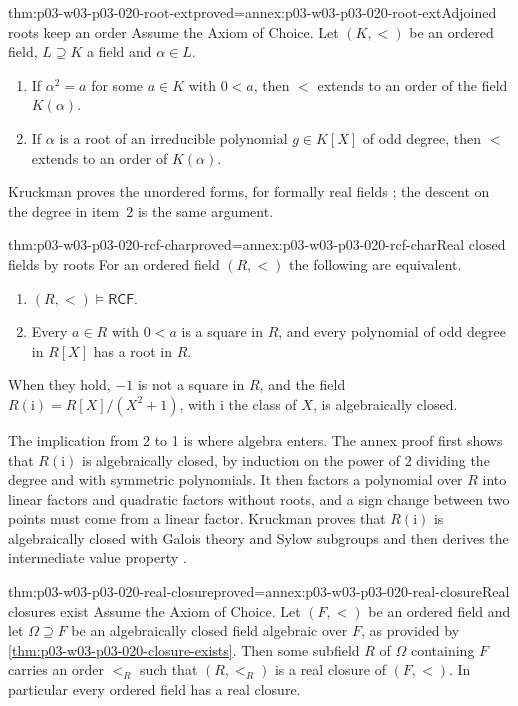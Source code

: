 \begin{hblemma}{thm:p03-w03-p03-020-root-ext}{proved=annex:p03-w03-p03-020-root-ext}{Adjoined roots keep an order}
Assume the Axiom of Choice. Let \((K,<)\) be an ordered field, \(L\supseteq
K\) a field and \(\alpha\in L\).
\begin{enumerate}
\item If \(\alpha^2=a\) for some \(a\in K\) with \(0<a\), then \(<\)
  extends to an order of the field \(K(\alpha)\).
\item If \(\alpha\) is a root of an irreducible polynomial \(g\in K[X]\) of
  odd degree, then \(<\) extends to an order of \(K(\alpha)\).
\end{enumerate}
\end{hblemma}

Kruckman proves the unordered forms, for formally real fields
\cite[Lemmas~3.20 and~3.21, p.~31]{Kruckman2020}; the descent on the degree
in item~2 is the same argument.

\begin{hbtheorem}{thm:p03-w03-p03-020-rcf-char}{proved=annex:p03-w03-p03-020-rcf-char}{Real closed fields by roots}
For an ordered field \((R,<)\) the following are equivalent.
\begin{enumerate}
\item \((R,<)\models\mathsf{RCF}\).
\item Every \(a\in R\) with \(0<a\) is a square in \(R\), and every
  polynomial of odd degree in \(R[X]\) has a root in \(R\).
\end{enumerate}
When they hold, \(-1\) is not a square in \(R\), and the field
\(R(\mathrm i)=R[X]/(X^2+1)\), with \(\mathrm i\) the class of \(X\), is
algebraically closed.
\end{hbtheorem}

The implication from 2 to 1 is where algebra enters. The annex proof first
shows that \(R(\mathrm i)\) is algebraically closed, by induction on the
power of \(2\) dividing the degree and with symmetric polynomials. It then
factors a polynomial over \(R\) into linear factors and quadratic factors
without roots, and a sign change between two points must come from a linear
factor. Kruckman proves that \(R(\mathrm i)\) is algebraically closed with
Galois theory and Sylow subgroups \cite[Theorem~3.22,
pp.~32--33]{Kruckman2020} and then derives the intermediate value property
\cite[Theorem~3.31, pp.~37--38]{Kruckman2020}.

\begin{hbtheorem}{thm:p03-w03-p03-020-real-closure}{proved=annex:p03-w03-p03-020-real-closure}{Real closures exist}
Assume the Axiom of Choice. Let \((F,<)\) be an ordered field and let
\(\Omega\supseteq F\) be an algebraically closed field algebraic over \(F\),
as provided by \cref{thm:p03-w03-p03-020-closure-exists}. Then some subfield
\(R\) of \(\Omega\) containing \(F\) carries an order \(<_R\) such that
\((R,<_R)\) is a real closure of \((F,<)\). In particular every ordered field
has a real closure.
\end{hbtheorem}

